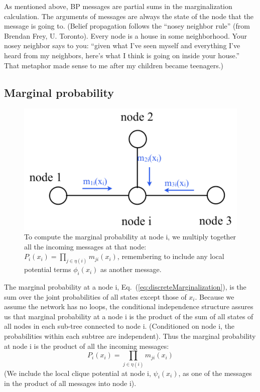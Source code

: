 As mentioned above, BP messages are partial sums in the
marginalization calculation.  The arguments of messages are always the
state of the node that the message is going to.
(Belief propagation follows the “nosey neighbor rule” (from Brendan Frey, U. Toronto). Every node is a house in some neighborhood. Your nosey neighbor says to you: “given what I've seen myself and everything I’ve heard from my neighbors, here’s what I think is going on inside
your house.” That metaphor made sense to me after my children became teenagers.)


\subsection{Marginal probability}

\begin{figure}
\centerline{\includegraphics[width=0.48\linewidth]{figures/graphical_models/bpi.pdf}} 
\caption{To compute the marginal probability at node i, we multiply
 together all the incoming messages at that node:  
$P_{i}(x_i) =  \prod_{j\in \eta(i)}  m_{ji}(x_i)$, remembering to
include any local potential terms $\phi_i(x_i)$ as another message.
}
\label{fig:bpi}
\end{figure}
 
The marginal probability at a node i, Eq.~(\ref{eq:discreteMarginalization}), is the sum over the joint probabilities of all states except those of $x_i$.  Because we assume the network has no loops, the conditional
independence structure assures us that marginal probability at a node i is the product of the sum of all states of all nodes in each
sub-tree connected to node i.  (Conditioned on node i, the probabilities within each subtree are independent). Thus the marginal probability at node i
is the product of all the incoming messages:
\begin{equation}
P_{i}(x_i) = \prod_{j\in \eta(i)}  m_{ji}(x_i)
\label{eq:bpmarginal}
\end{equation}
(We include the local clique potential at node i, $\psi_i(x_i)$, as
one of the messages in the product of all messages into node i).


